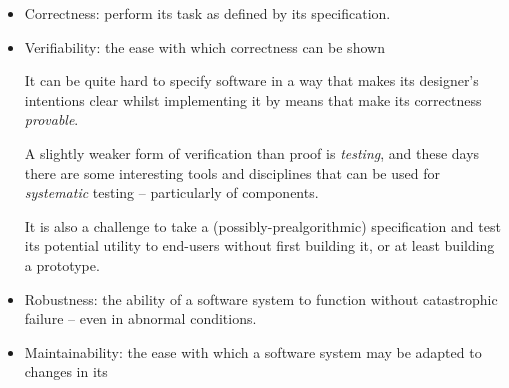 \documentclass{ip3}
\begin{document}
\begin{foil}
\begin{itemize}
\begin{note}
      If a program/component doesn't do what it's supposed to do
      then its other qualities matter little. 
      
      But the specification of a \textit{system}  or a \textit{program}
      is more than a purely technical question. The program, as
      specified, must meet its operational requirements. It must
      support its end users to do their jobs or live their lives.
      
      Those who commission or purchase a corporate or governmental system
      are not often its end users, and there are countless cases of
      expensive systems that, whilst \textit{technically correct} 
      do not meet the requirements of the situation in which they will
      be deployed. The sociotechnical problem of \textit{requirements elicitation} is
      interesting in its own right. 
\end{note}
\item Correctness: perform its task as defined by its specification.
\item Verifiability: the ease with which correctness can be shown 
\begin{note}
      It can be quite hard to specify software in a way that
      makes its designer's intentions clear whilst implementing it
      by means that make its correctness \textit{provable}. 
\par      
      A slightly weaker form of verification than proof is \textit{testing},
      and these days there are some interesting tools and disciplines 
      that can be used for \textit{systematic} testing --
      particularly of components.
\par      
      It is also a challenge to take a (possibly-prealgorithmic) specification
      and test its potential utility to end-users without first building it, or at least 
      building a prototype.
\end{note}
\item Robustness: the ability of a software system to function without catastrophic failure -- even in abnormal conditions.
\item Maintainability: the ease with which a software system may be adapted to changes in its

\end{itemize}
\end{foil}
\end{document}
